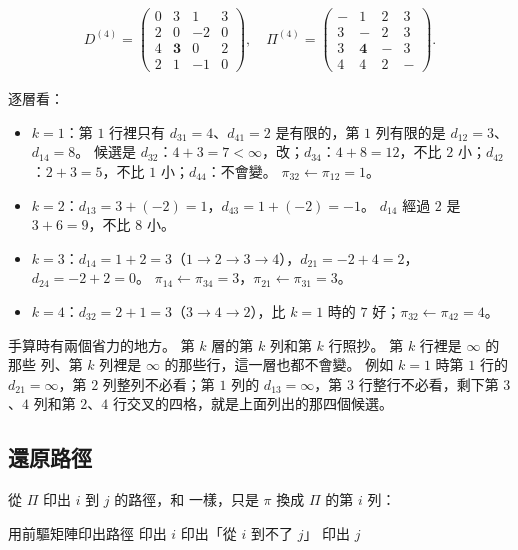 \begin{gather*}
D^{(4)} = \begin{pmatrix} 0 & 3 & 1 & 3 \\ 2 & 0 & -2 & 0 \\ 4 & \mathbf{3} & 0 & 2 \\ 2 & 1 & -1 & 0 \end{pmatrix},\quad
\Pi^{(4)} = \begin{pmatrix} - & 1 & 2 & 3 \\ 3 & - & 2 & 3 \\ 3 & \mathbf{4} & - & 3 \\ 4 & 4 & 2 & - \end{pmatrix}.
\end{gather*}

逐層看：
\begin{itemize}
\item $k = 1$：第 $1$ 行裡只有 $d_{31} = 4$、$d_{41} = 2$ 是有限的，第 $1$ 列有限的是 $d_{12}
= 3$、$d_{14} = 8$。 候選是 $d_{32}$：$4 + 3 = 7 < \infty$，改；$d_{34}$：$4 + 8 = 12$，不比
$2$ 小；$d_{42}$：$2 + 3 = 5$，不比 $1$ 小；$d_{44}$：不會變。 $\pi_{32} \gets \pi_{12} = 1$。
\item $k = 2$：$d_{13} = 3 + (-2) = 1$，$d_{43} = 1 + (-2) = -1$。 $d_{14}$ 經過 $2$ 是 $3 + 6
= 9$，不比 $8$ 小。
\item $k = 3$：$d_{14} = 1 + 2 = 3$（$1 \to 2 \to 3 \to 4$），$d_{21} = -2 + 4 = 2$，$d_{24} =
-2 + 2 = 0$。 $\pi_{14} \gets \pi_{34} = 3$，$\pi_{21} \gets \pi_{31} = 3$。
\item $k = 4$：$d_{32} = 2 + 1 = 3$（$3 \to 4 \to 2$），比 $k = 1$ 時的 $7$ 好；$\pi_{32} \gets
\pi_{42} = 4$。
\end{itemize}

手算時有兩個省力的地方。 第 $k$ 層的第 $k$ 列和第 $k$ 行照抄。 第 $k$ 行裡是 $\infty$ 的那些
列、第 $k$ 列裡是 $\infty$ 的那些行，這一層也都不會變。 例如 $k = 1$ 時第 $1$ 行的 $d_{21} =
\infty$，第 $2$ 列整列不必看；第 $1$ 列的 $d_{13} = \infty$，第 $3$ 行整行不必看，剩下第 $3$、$4$
列和第 $2$、$4$ 行交叉的四格，就是上面列出的那四個候選。

\subsection{還原路徑}

從 $\Pi$ 印出 $i$ 到 $j$ 的路徑，和  一樣，只是 $\pi$ 換成 $\Pi$ 的第 $i$
列：

\begin{pseudo}[label=alg:spt-fwpath]{用前驅矩陣印出路徑}
        \State 印出 $i$
    \ElsIf{$\Pi[i, j] = \NIL$}
        \State 印出「從 $i$ 到不了 $j$」
    \Else
        \State {}
        \State 印出 $j$
    \EndIf
\EndProcedure
\end{pseudo}

